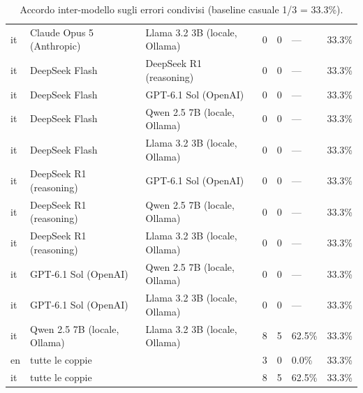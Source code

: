 \begin{table}[htbp]
\begin{tabularx}{\textwidth}{lXXXXXX}
it & Claude Opus 5 (Anthropic) & Llama 3.2 3B (locale, Ollama) & 0 & 0 & — & 33.3\% \\
it & DeepSeek Flash & DeepSeek R1 (reasoning) & 0 & 0 & — & 33.3\% \\
it & DeepSeek Flash & GPT-6.1 Sol (OpenAI) & 0 & 0 & — & 33.3\% \\
it & DeepSeek Flash & Qwen 2.5 7B (locale, Ollama) & 0 & 0 & — & 33.3\% \\
it & DeepSeek Flash & Llama 3.2 3B (locale, Ollama) & 0 & 0 & — & 33.3\% \\
it & DeepSeek R1 (reasoning) & GPT-6.1 Sol (OpenAI) & 0 & 0 & — & 33.3\% \\
it & DeepSeek R1 (reasoning) & Qwen 2.5 7B (locale, Ollama) & 0 & 0 & — & 33.3\% \\
it & DeepSeek R1 (reasoning) & Llama 3.2 3B (locale, Ollama) & 0 & 0 & — & 33.3\% \\
it & GPT-6.1 Sol (OpenAI) & Qwen 2.5 7B (locale, Ollama) & 0 & 0 & — & 33.3\% \\
it & GPT-6.1 Sol (OpenAI) & Llama 3.2 3B (locale, Ollama) & 0 & 0 & — & 33.3\% \\
it & Qwen 2.5 7B (locale, Ollama) & Llama 3.2 3B (locale, Ollama) & 8 & 5 & 62.5\% & 33.3\% \\
en & tutte le coppie &  & 3 & 0 & 0.0\% & 33.3\% \\
it & tutte le coppie &  & 8 & 5 & 62.5\% & 33.3\% \\
\bottomrule
\end{tabularx}
\caption{Accordo inter-modello sugli errori condivisi (baseline casuale 1/3 = 33.3\%).}
\label{tab:accordo}
\end{table}
